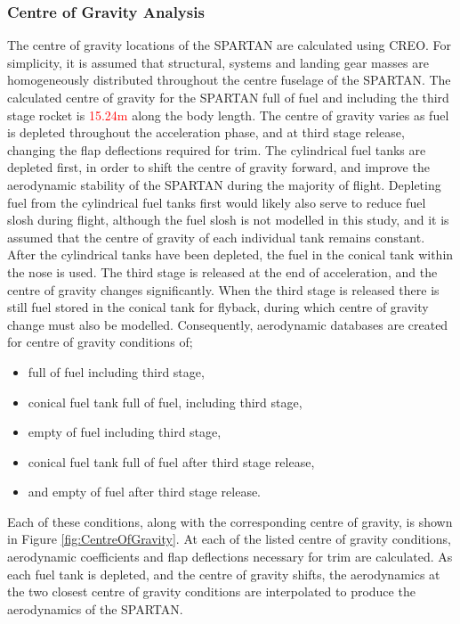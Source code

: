 		\subsubsection{Centre of Gravity Analysis}
		The centre of gravity locations of the SPARTAN are calculated using CREO. For simplicity, it is assumed that structural, systems and landing gear masses are homogeneously distributed throughout the centre fuselage of the SPARTAN. 
		The calculated centre of gravity for the SPARTAN full of fuel and including the third stage rocket is \textcolor{red}{15.24m} along the body length. The centre of gravity varies as fuel is depleted throughout the acceleration phase, and at third stage release, changing the flap deflections required for trim. The cylindrical fuel tanks are depleted first, in order to shift the centre of gravity forward, and improve the aerodynamic stability of the SPARTAN during the majority of flight. Depleting fuel from the cylindrical fuel tanks first would likely also serve to reduce fuel slosh during flight, although the fuel slosh is not modelled in this study, and it is assumed that the centre of gravity of each individual tank remains constant. After the cylindrical tanks have been depleted, the fuel in the conical tank within the nose is used. The third stage is released at the end of acceleration, and the centre of gravity changes significantly. When the third stage is released there is still fuel stored in the conical tank for flyback, during which centre of gravity change must also be modelled. 
		Consequently, aerodynamic databases are created for centre of gravity conditions of; 
		\begin{itemize}
			\item full of fuel including third stage,
			\item conical fuel tank full of fuel, including third stage,
			\item empty of fuel including third stage,
			\item conical fuel tank full of fuel after third stage release,
			\item and empty of fuel after third stage release.
		\end{itemize}
		Each of these conditions, along with the corresponding centre of gravity, is shown in Figure \ref{fig:CentreOfGravity}. At each of the listed centre of gravity conditions, aerodynamic coefficients and flap deflections necessary for trim are calculated.  As each fuel tank is depleted, and the centre of gravity shifts, the aerodynamics at the two closest centre of gravity conditions are interpolated to produce the aerodynamics of the SPARTAN.  
		

